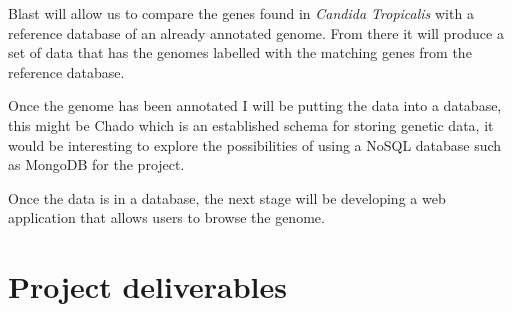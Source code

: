 \documentclass[11pt,fleqn,twoside]{article}
\begin{document}
Blast will allow us to compare the genes found in \textit{Candida Tropicalis} with a reference database of an already annotated genome. From there it will produce a set of data that has the genomes labelled with the matching genes from the reference database.

Once the genome has been annotated I will be putting the data into a database, this might be Chado\cite{chado} which is an established schema for storing genetic data, it would be interesting to explore the possibilities of using a NoSQL database such as MongoDB for the project. 

Once the data is in a database, the next stage will be developing a web application that allows users to browse the genome.


\section{Project deliverables}

%
%
%


\nocite{*} %

\newpage
{}
%
%

\renewcommand{\refname}{Annotated Bibliography}  %
\end{document}
